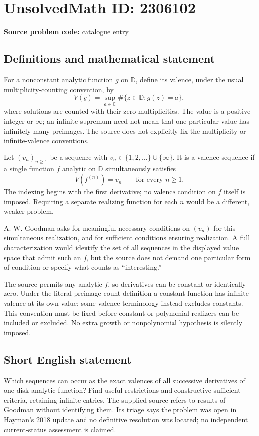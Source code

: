 \documentclass[11pt]{article}
\newcommand{\C}{\mathbb{C}}
\begin{document}
\section*{UnsolvedMath ID: 2306102}
\textbf{Source problem code:} catalogue entry
\subsection{Definitions and mathematical statement}
For a nonconstant analytic function $g$ on $\mathbb D$, define its valence, under the usual multiplicity-counting convention, by
\[
 V(g)=\sup_{a\in\C}\#\{z\in\mathbb D:g(z)=a\},
\]
where solutions are counted with their zero multiplicities. The value is a positive integer or $\infty$; an infinite supremum need not mean that one particular value has infinitely many preimages. The source does not explicitly fix the multiplicity or infinite-valence conventions.

Let $(v_n)_{n\geq1}$ be a sequence with $v_n\in\{1,2,\ldots\}\cup\{\infty\}$. It is a valence sequence if a single function $f$ analytic on $\mathbb D$ simultaneously satisfies
\[
 V(f^{(n)})=v_n\qquad\text{for every }n\geq1.
\]
The indexing begins with the first derivative; no valence condition on $f$ itself is imposed. Requiring a separate realizing function for each $n$ would be a different, weaker problem.

A. W. Goodman asks for meaningful necessary conditions on $(v_n)$ for this simultaneous realization, and for sufficient conditions ensuring realization. A full characterization would identify the set of all sequences in the displayed value space that admit such an $f$, but the source does not demand one particular form of condition or specify what counts as ``interesting.''

The source permits any analytic $f$, so derivatives can be constant or identically zero. Under the literal preimage-count definition a constant function has infinite valence at its own value; some valence terminology instead excludes constants. This convention must be fixed before constant or polynomial realizers can be included or excluded. No extra growth or nonpolynomial hypothesis is silently imposed.
\subsection{Short English statement}
Which sequences can occur as the exact valences of all successive derivatives of one disk-analytic function? Find useful restrictions and constructive sufficient criteria, retaining infinite entries. The supplied source refers to results of Goodman without identifying them. Its triage says the problem was open in Hayman's 2018 update and no definitive resolution was located; no independent current-status assessment is claimed.
\end{document}
